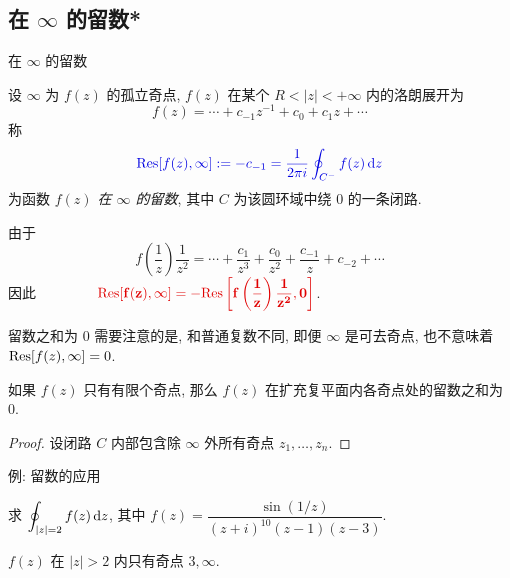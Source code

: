 \subsection{在 \texorpdfstring{$\infty$}{∞} 的留数*}

\begin{frame}{在 $\infty$ 的留数\noexer}
	\onslide<+->
	\begin{definition}
		设 $\infty$ 为 $f(z)$ 的孤立奇点, $f(z)$ 在某个 $R<|z|<+\infty$ 内的洛朗展开为
		\[f(z)=\cdots+c_{-1}z^{-1}+c_0+c_1z+\cdots\]
		称
		\[\emph{\Res[f(z),\infty]:=-c_{-1}=\frac1{2\pi i}\oint_{C^-}f(z)\diff z}\]
		为函数 \emph{$f(z)$ 在 $\infty$ 的留数}, 其中 $C$ 为该圆环域中绕 $0$ 的一条闭路.
	\end{definition}

	\onslide<+->
	由于
	\[f\left(\frac1z\right)\frac1{z^2}=\cdots+\frac{c_1}{z^3}+\frac{c_0}{z^2}+\frac{c_{-1}}z+c_{-2}+\cdots\]
	\onslide<+->
	因此 $\displaystyle\qquad\qquad\alert{\Res[f(z),\infty]=-\Res\left[f\left(\frac1z\right)\frac1{z^2},0\right]}$.
\end{frame}


\begin{frame}{留数之和为 $0$\noexer}
	\onslide<+->
	需要注意的是, 和普通复数不同, \alert{即便 $\infty$ 是可去奇点, 也不意味着 ${\mathrm{Res}}[f(z),\infty]=0$}.

	\onslide<+->
	\begin{theorem}
		如果 $f(z)$ 只有有限个奇点, 那么 $f(z)$ 在扩充复平面内各奇点处的留数之和为 $0$.
	\end{theorem}

	\onslide<+->
	\begin{proof}
			设闭路 $C$ 内部包含除 $\infty$ 外所有奇点 $z_1,\dots,z_n$.
		\onslide<+->{故 $\suml_{k=1}^n\Res[f(z),z_k]+\Res[f(z),\infty]=0$.\qedhere
		}
	\end{proof}
\end{frame}


\begin{frame}{例: 留数的应用\noexer}
	\onslide<+->
	\begin{example}
		求 $\displaystyle\oint_{|z|=2}f(z)\,\mathrm{d} z$, 其中 $f(z)=\dfrac{\sin(1/z)}{(z+i)^{10}(z-1)(z-3)}$.
	\end{example}

	\onslide<+->
	\begin{solution}
		$f(z)$ 在 $|z|>2$ 内只有奇点 $3,\infty$.
	\onslide<+->{
		\[\Res[f(z),3]=\lim_{z\to3}(z-3)f(z)=\frac1{2(3+i)^{10}}\sin\frac13.\]
	}
	\end{solution}
\end{frame}


